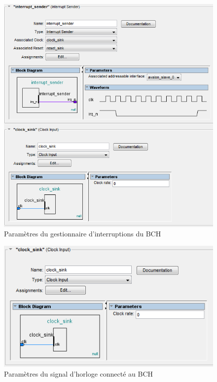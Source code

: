 \documentclass[a4paper, 11pt, svgnames]{report}
\begin{document}
        \begin{figure}[H]
            \centering
            \includegraphics[width=\textwidth]{./images/interrupt_sender}
            \caption{Paramètres du gestionnaire d'interruptions du BCH}
            \label{fig:interrupt_sender}
        \end{figure}

        \begin{figure}[H]
            \centering
            \includegraphics[width=\textwidth]{./images/clock_sink}
            \caption{Paramètres du signal d'horloge connecté au BCH}
            \label{fig:clock_sink}
        \end{figure}
\end{document}
